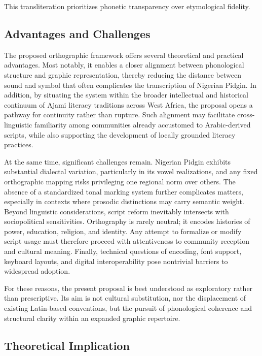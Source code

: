 \documentclass[12pt]{article}
\begin{document}
This transliteration prioritizes phonetic transparency over etymological fidelity.

\subsection{Advantages and Challenges}

The proposed orthographic framework offers several theoretical and practical advantages. Most notably, it enables a closer alignment between phonological structure and graphic representation, thereby reducing the distance between sound and symbol that often complicates the transcription of Nigerian Pidgin. In addition, by situating the system within the broader intellectual and historical continuum of Ajami literacy traditions across West Africa, the proposal opens a pathway for continuity rather than rupture. Such alignment may facilitate cross-linguistic familiarity among communities already accustomed to Arabic-derived scripts, while also supporting the development of locally grounded literacy practices.

At the same time, significant challenges remain. Nigerian Pidgin exhibits substantial dialectal variation, particularly in its vowel realizations, and any fixed orthographic mapping risks privileging one regional norm over others. The absence of a standardized tonal marking system further complicates matters, especially in contexts where prosodic distinctions may carry semantic weight. Beyond linguistic considerations, script reform inevitably intersects with sociopolitical sensitivities. Orthography is rarely neutral; it encodes histories of power, education, religion, and identity. Any attempt to formalize or modify script usage must therefore proceed with attentiveness to community reception and cultural meaning. Finally, technical questions of encoding, font support, keyboard layouts, and digital interoperability pose nontrivial barriers to widespread adoption.

For these reasons, the present proposal is best understood as exploratory rather than prescriptive. Its aim is not cultural substitution, nor the displacement of existing Latin-based conventions, but the pursuit of phonological coherence and structural clarity within an expanded graphic repertoire.

\subsection{Theoretical Implication}
\end{document}
